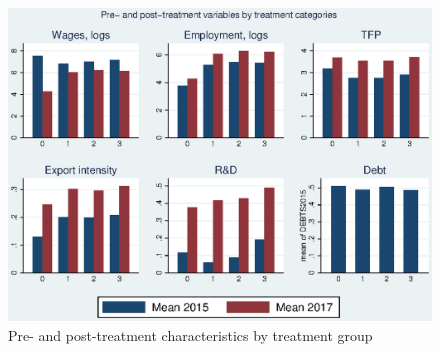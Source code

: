 \begin{figure}[htbp!]\caption{Pre- and post-treatment characteristics by treatment group}\label{fig_treatment_type}
\begin{center}
\includegraphics[scale=1]{figures_and_tables/bar_pre_post} 
\end{center}
\end{figure}

